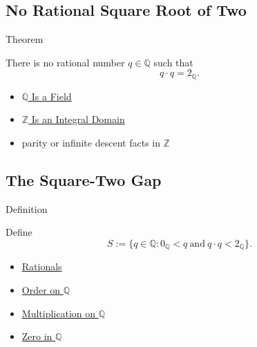 \subsection*{No Rational Square Root of Two}

\begin{theorembox}{Theorem}
\begin{theorem}
\label{thm:no-rational-square-root-of-two}
There is no rational number $q\in\mathbb{Q}$ such that
\[
q\cdot q=2_{\mathbb{Q}}.
\]
\end{theorem}
\end{theorembox}

\begin{dependencies}
\begin{itemize}
  \item \hyperref[thm:q-is-a-field]{$\mathbb{Q}$ Is a Field}
  \item \hyperref[thm:z-integral-domain]{$\mathbb{Z}$ Is an Integral Domain}
  \item parity or infinite descent facts in $\mathbb{Z}$
\end{itemize}
\end{dependencies}

\subsection*{The Square-Two Gap}

\begin{definitionbox}{Definition}
\begin{definition}
\label{def:gap-set-q}
Define
\[
S:=\{q\in\mathbb{Q}:0_{\mathbb{Q}}<q\ \text{and}\ q\cdot q<2_{\mathbb{Q}}\}.
\]
\end{definition}
\end{definitionbox}

\begin{dependencies}
\begin{itemize}
  \item \hyperref[def:rationals]{Rationals}
  \item \hyperref[def:order-on-q]{Order on $\mathbb{Q}$}
  \item \hyperref[def:multiplication-on-q-classes]{Multiplication on $\mathbb{Q}$}
  \item \hyperref[def:zero-in-q]{Zero in $\mathbb{Q}$}
\end{itemize}
\end{dependencies}

